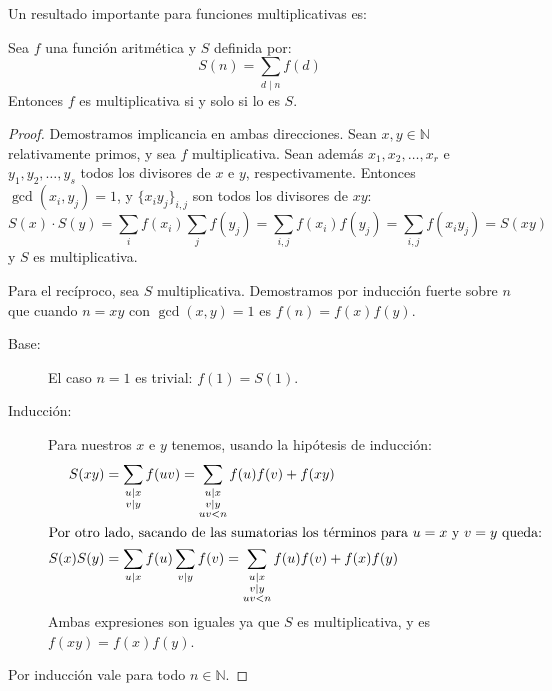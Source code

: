   Un resultado importante para funciones multiplicativas es:
  \begin{theorem}
    \label{theo:sum-multiplicative}
    Sea \(f\) una función aritmética%
    y \(S\) definida por:%
    \begin{equation*}
      S(n)
	= \sum_{d \mid n} f(d)
    \end{equation*}
    Entonces \(f\) es multiplicativa si y solo si lo es \(S\).
  \end{theorem}
  \begin{proof}
    Demostramos implicancia en ambas direcciones.
    Sean \(x, y \in \mathbb{N}\) relativamente primos,
    y sea \(f\) multiplicativa.
    Sean además \(x_1, x_2, \dotsc, x_r\)
    e \(y_1, y_2, \dotsc, y_s\)
    todos los divisores de \(x\) e \(y\),
    respectivamente.
    Entonces \(\gcd(x_i, y_j) = 1\),
    y \(\{x_i y_j\}_{i, j}\) son todos los divisores de \(x y\):
    \begin{equation*}
      S(x) \cdot S(y)
	= \sum_i f(x_i) \sum_j f(y_j)
	= \sum_{i, j} f(x_i) f(y_j)
	= \sum_{i, j} f(x_i y_j)
	= S(x y)
    \end{equation*}
    y \(S\) es multiplicativa.

    Para el recíproco,
    sea \(S\) multiplicativa.
    Demostramos por inducción fuerte sobre \(n\)%
    que cuando \(n = x y\) con \(\gcd(x, y) = 1\)
    es \(f(n) = f(x) f(y)\).
    \begin{description}
    \item[Base:]
      El caso \(n = 1\) es trivial:
      \(f(1) = S(1)\).
    \item[Inducción:]
      Para nuestros \(x\) e \(y\) tenemos,
      usando la hipótesis de inducción:
      \begin{align*}
	S(x y)
	  &= \sum_{\substack{
		     u \mid x \\
		     v \mid y
		  }} f(u v)
	   = \sum_{\substack{
		    u \mid x \\
		    v \mid y \\
		    u v < n
		 }} f(u) f(v) + f(x y) \\
      \intertext{Por otro lado,
		 sacando de las sumatorias los términos
		 para \(u = x\) y \(v = y\) queda:}
	S(x) S(y)
	  &= \sum_{u \mid x} f(u) \sum_{v \mid y} f(v)
	   = \sum_{\substack{
		    u \mid x \\
		    v \mid y \\
		    u v < n
		 }} f(u) f(v) + f(x) f(y)
      \end{align*}
      Ambas expresiones son iguales ya que \(S\) es multiplicativa,
      y es \(f(x y) = f(x) f(y)\).
    \end{description}
    Por inducción vale para todo \(n \in \mathbb{N}\).
  \end{proof}
